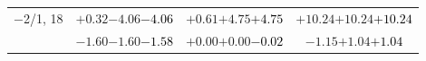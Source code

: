 \documentclass[compress]{beamer}
\begin{document}
\begin{frame}
\begin{tabular}{r | c | c | c}
$-$2/1, 18 & $+0.32$\hspace{0.1 cm}$-4.06$\hspace{0.1 cm}\textcolor{black}{$-4.06$} & $+0.61$\hspace{0.1 cm}$+4.75$\hspace{0.1 cm}\textcolor{black}{$+4.75$} & $+10.24$\hspace{0.1 cm}$+10.24$\hspace{0.1 cm}\textcolor{black}{$+10.24$} \\
           & $-1.60$\hspace{0.1 cm}$-1.60$\hspace{0.1 cm}\textcolor{black}{$-1.58$} & $+0.00$\hspace{0.1 cm}$+0.00$\hspace{0.1 cm}\textcolor{black}{$-0.02$} & $-1.15$\hspace{0.1 cm}$+1.04$\hspace{0.1 cm}\textcolor{black}{$+1.04$} \\
\end{tabular}
\end{frame}
\end{document}
